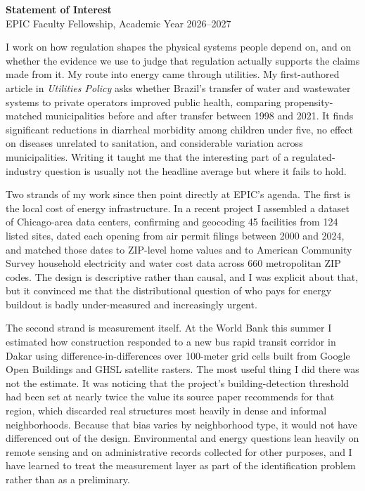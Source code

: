 

\begin{center}{\bfseries\large Statement of Interest}\\[2pt]
{\small EPIC Faculty Fellowship, Academic Year 2026--2027}\end{center}
\vspace{6pt}

I work on how regulation shapes the physical systems people depend on, and on whether the evidence we use to judge that regulation actually supports the claims made from it. My route into energy came through utilities. My first-authored article in \textit{Utilities Policy} asks whether Brazil's transfer of water and wastewater systems to private operators improved public health, comparing propensity-matched municipalities before and after transfer between 1998 and 2021. It finds significant reductions in diarrheal morbidity among children under five, no effect on diseases unrelated to sanitation, and considerable variation across municipalities. Writing it taught me that the interesting part of a regulated-industry question is usually not the headline average but where it fails to hold.

Two strands of my work since then point directly at EPIC's agenda. The first is the local cost of energy infrastructure. In a recent project I assembled a dataset of Chicago-area data centers, confirming and geocoding 45 facilities from 124 listed sites, dated each opening from air permit filings between 2000 and 2024, and matched those dates to ZIP-level home values and to American Community Survey household electricity and water cost data across 660 metropolitan ZIP codes. The design is descriptive rather than causal, and I was explicit about that, but it convinced me that the distributional question of who pays for energy buildout is badly under-measured and increasingly urgent.

The second strand is measurement itself. At the World Bank this summer I estimated how construction responded to a new bus rapid transit corridor in Dakar using difference-in-differences over 100-meter grid cells built from Google Open Buildings and GHSL satellite rasters. The most useful thing I did there was not the estimate. It was noticing that the project's building-detection threshold had been set at nearly twice the value its source paper recommends for that region, which discarded real structures most heavily in dense and informal neighborhoods. Because that bias varies by neighborhood type, it would not have differenced out of the design. Environmental and energy questions lean heavily on remote sensing and on administrative records collected for other purposes, and I have learned to treat the measurement layer as part of the identification problem rather than as a preliminary.


